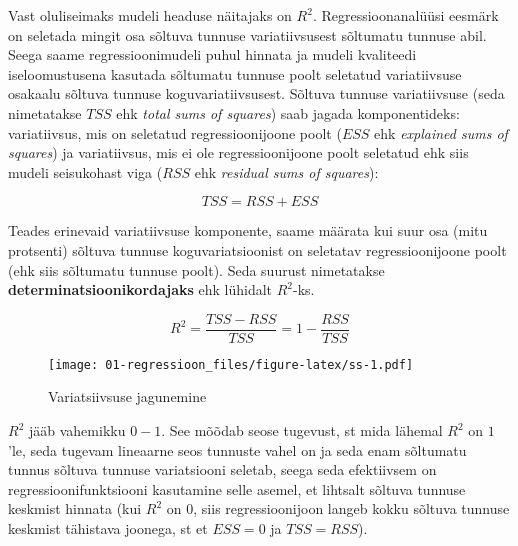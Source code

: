 \documentclass[
]{book}
\begin{document}
Vast oluliseimaks mudeli headuse näitajaks on \(R^2\). Regressioonanalüüsi eesmärk on seletada mingit osa sõltuva tunnuse variatiivsusest sõltumatu tunnuse abil. Seega saame regressioonimudeli puhul hinnata ja mudeli kvaliteedi iseloomustusena kasutada sõltumatu tunnuse poolt seletatud variatiivsuse osakaalu sõltuva tunnuse koguvariatiivsusest. Sõltuva tunnuse variatiivsuse (seda nimetatakse \(TSS\) ehk \emph{total sums of squares}) saab jagada komponentideks: variatiivsus, mis on seletatud regressioonijoone poolt (\(ESS\) ehk \emph{explained sums of squares}) ja variatiivsus, mis ei ole regressioonijoone poolt seletatud ehk siis mudeli seisukohast viga (\(RSS\) ehk \emph{residual sums of squares}):

\[TSS=RSS+ESS\]


Teades erinevaid variatiivsuse komponente, saame määrata kui suur osa (mitu protsenti) sõltuva tunnuse koguvariatsioonist on seletatav regressioonijoone poolt (ehk siis sõltumatu tunnuse poolt). Seda suurust nimetatakse \textbf{determinatsioonikordajaks} ehk lühidalt \(R^2\)-ks.

\begin{equation}
R^2=\frac{TSS-RSS}{TSS}=1-\frac{RSS}{TSS}
\end{equation}

\begin{figure}
\centering
\texttt{[image: 01-regressioon\_files/figure-latex/ss-1.pdf]}
\caption{\label{fig:ss}Variatsiivsuse jagunemine}
\end{figure}

\(R^2\) jääb vahemikku \(0-1\). See mõõdab seose tugevust, st mida lähemal \(R^2\) on \(1\)'le, seda tugevam lineaarne seos tunnuste vahel on ja seda enam sõltumatu tunnus sõltuva tunnuse variatsiooni seletab, seega seda efektiivsem on regressioonifunktsiooni kasutamine selle asemel, et lihtsalt sõltuva tunnuse keskmist hinnata (kui \(R^2\) on \(0\), siis regressioonijoon langeb kokku sõltuva tunnuse keskmist tähistava joonega, st et \(ESS=0\) ja \(TSS=RSS\)).
\end{document}
